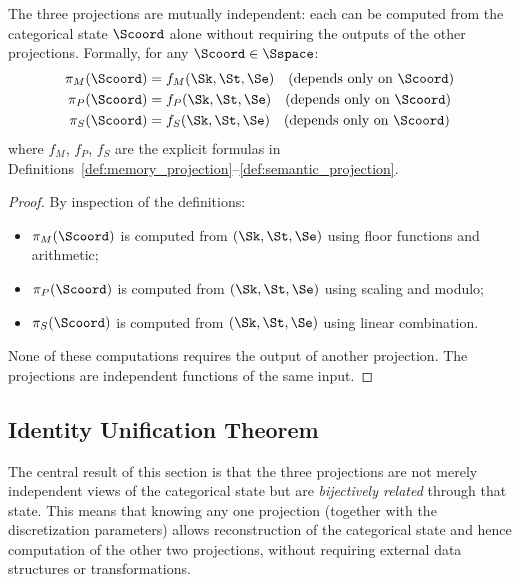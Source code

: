 \begin{proposition}
\label{prop:projection_independence}
The three projections are mutually independent: each can be computed from the categorical state $\Scoord$ alone without requiring the outputs of the other projections. Formally, for any $\Scoord \in \Sspace$:
\begin{align}
\pi_M(\Scoord) &= f_M(\Sk, \St, \Se) \quad \text{(depends only on } \Scoord\text{)} \\
\pi_P(\Scoord) &= f_P(\Sk, \St, \Se) \quad \text{(depends only on } \Scoord\text{)} \\
\pi_S(\Scoord) &= f_S(\Sk, \St, \Se) \quad \text{(depends only on } \Scoord\text{)}
\end{align}
where $f_M$, $f_P$, $f_S$ are the explicit formulas in Definitions~\ref{def:memory_projection}--\ref{def:semantic_projection}.
\end{proposition}

\begin{proof}
By inspection of the definitions:
\begin{itemize}
    \item $\pi_M(\Scoord)$ is computed from $(\Sk, \St, \Se)$ using floor functions and arithmetic;
    \item $\pi_P(\Scoord)$ is computed from $(\Sk, \St, \Se)$ using scaling and modulo;
    \item $\pi_S(\Scoord)$ is computed from $(\Sk, \St, \Se)$ using linear combination.
\end{itemize}
None of these computations requires the output of another projection. The projections are independent functions of the same input.
\end{proof}

\subsection{Identity Unification Theorem}

The central result of this section is that the three projections are not merely independent views of the categorical state but are \textit{bijectively related} through that state. This means that knowing any one projection (together with the discretization parameters) allows reconstruction of the categorical state and hence computation of the other two projections, without requiring external data structures or transformations.

